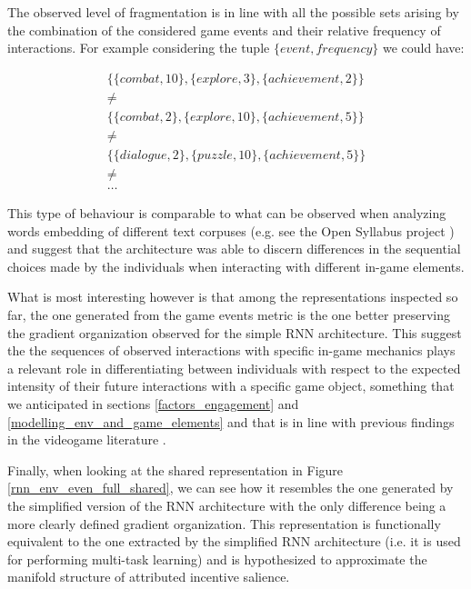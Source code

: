 The observed level of fragmentation is in line with all the possible sets arising by the combination of the considered game events and their relative frequency of interactions. For example considering the tuple $\{event, frequency\}$ we could have:

\begin{gather}
\label{seq_differences}
    \{\{combat, 10\}, \{explore, 3\}, \{achievement, 2\}\} \\ \nonumber
    \neq \\ \nonumber
    \{\{combat, 2\}, \{explore, 10\}, \{achievement, 5\}\} \\ \nonumber
    \neq \\ \nonumber
    \{\{dialogue, 2\}, \{puzzle, 10\}, \{achievement, 5\}\} \\ \nonumber 
    \neq \\ \nonumber
    \dots
\end{gather}

This type of behaviour is comparable to what can be observed when analyzing words embedding of different text corpuses (e.g. see the Open Syllabus project \cite{opensyllabus}) and suggest that the architecture was able to discern differences in the sequential choices made by the individuals when interacting with different in-game elements.

What is most interesting however is that among the representations inspected so far, the one generated from the game events metric is the one better preserving the gradient organization observed for the simple RNN architecture. This suggest the the sequences of observed interactions with specific in-game mechanics plays a relevant role in differentiating between individuals with respect to the expected intensity of their future interactions with a specific game object, something that we anticipated in sections \ref{factors_engagement} and \ref{modelling_env_and_game_elements} and that is in line with previous findings in the videogame literature \cite{makarovych2018like}.

Finally, when looking at the shared representation in Figure \ref{rnn_env_even_full_shared}, we can see how it resembles the one generated by the simplified version of the RNN architecture with the only difference being a more clearly defined gradient organization. This representation is functionally equivalent to the one extracted by the simplified RNN architecture (i.e. it is used for performing multi-task learning) and is hypothesized to approximate the manifold structure of attributed incentive salience.

